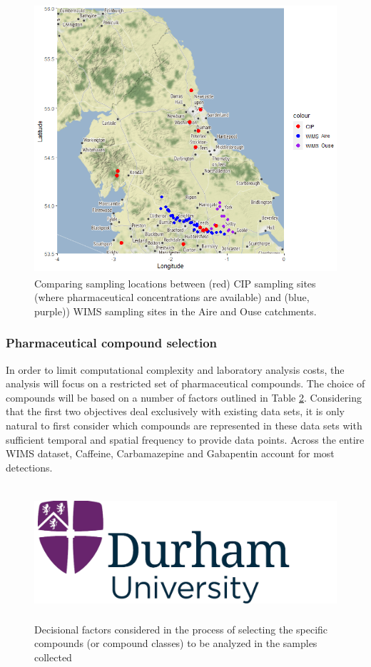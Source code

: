 \documentclass{article}
\begin{document}
\begin{figure}
    \centering
    \includegraphics[height=10cm]{fig_catchments_wims_cip.png}
    \caption{Comparing sampling locations between (red) CIP sampling sites (where pharmaceutical concentrations are available) and (blue, purple)) WIMS sampling sites in the Aire and Ouse catchments.}
    \label{fig_catchment_map}
\end{figure}

\subsubsection{Pharmaceutical compound selection}
In order to limit computational complexity and laboratory analysis costs, the analysis will focus on a restricted set of pharmaceutical compounds. The choice of compounds will be based on a number of factors outlined in Table \ref{table_compound_choice}. Considering that the first two objectives deal exclusively with existing data sets, it is only natural to first consider which compounds are represented in these data sets with sufficient temporal and spatial frequency to provide data points. Across the entire WIMS dataset, Caffeine, Carbamazepine and Gabapentin account for most detections.


\begin{figure}
    \centering
    \includegraphics[height=5cm]{logo.png}
    \caption{Decisional factors considered in the process of selecting the specific compounds (or compound classes) to be analyzed in the samples collected}
    \label{table_compound_choice}
\end{figure}
\end{document}

